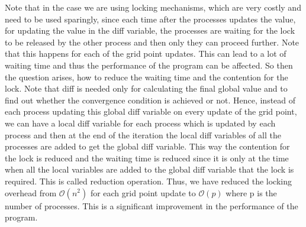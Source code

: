 \documentclass[12pt]{article}
\begin{document}
Note that in the case we are using locking mechanisms, which are very costly and need to be used sparingly,
since each time after the processes updates the value, for updating the value in the diff variable, the processes are waiting for the lock to be released by the other process and then only they can proceed further. 
Note that this happens for each of the grid point updates. 
This can lead to a lot of waiting time and thus the performance of the program can be affected.
So then the question arises, how to reduce the waiting time and the contention for the lock.
Note that diff is needed only for calculating the final global value and to find out whether the convergence condition is achieved or not.
Hence, instead of each process updating this global diff variable on every update of the grid point, we can have a local diff variable for each process which is updated by each process and then at the end of the iteration
the local diff variables of all the processes are added to get the global diff variable. This way the contention for the lock is reduced and the waiting time is reduced since it is only at the time when all the
local variables are added to the global diff variable that the lock is required. This is called reduction operation. Thus, we have reduced the locking overhead from $\mathcal{O}(n^2)$ for each grid point 
update to $\mathcal{O}(p)$ where p is the number of processes. This is a significant improvement in the performance of the program.
\end{document}
